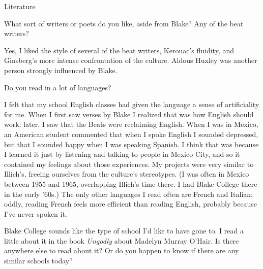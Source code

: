 \documentclass[11pt,oneside,openany,extrafontsizes]{memoir}
\begin{document}
\begin{emailexchange}{Literature}

    \begin{question}
        What sort of writers or poets do you like, aside from Blake? Any of the beat writers?
    \end{question}

    \begin{answer}
      Yes, I liked the style of several of the beat writers, Kerouac's fluidity, and Ginsberg's more intense confrontation of the culture. Aldous Huxley was another person strongly influenced by Blake.
    \end{answer}
	
    \begin{question}
        Do you read in a lot of languages?
    \end{question}

    \begin{answer}
      I felt that my school English classes had given the language a sense of artificiality for me. When I first saw verses by Blake I realized that was how English should work; later, I saw that the Beats were reclaiming English. When I was in Mexico, an American student commented that when I spoke English I sounded depressed, but that I sounded happy when I was speaking Spanish. I think that was because I learned it just by listening and talking to people in Mexico City, and so it contained my feelings about those experiences. My projects were very similar to Illich's, freeing ourselves from the culture's stereotypes. (I was often in Mexico between 1955 and 1965, overlapping Illich's time there. I had Blake College there in the early '60s.) The only other languages I read often are French and Italian; oddly, reading French feels more efficient than reading English, probably because I've never spoken it.
    \end{answer}
	
    \begin{question}
        Blake College sounds like the type of school I'd like to have gone to. I read a little about it in the book \textit{Ungodly} about Madelyn Murray O'Hair. Is there anywhere else to read about it? Or do you happen to know if there are any similar schools today?
    \end{question}


\end{emailexchange}
\end{document}
